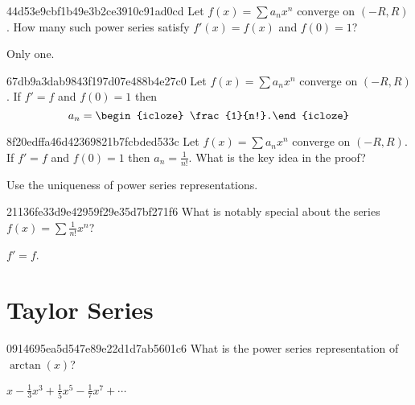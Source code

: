 \begin{note}{44d53e9cbf1b49e3b2ce3910c91ad0cd}
    Let \({ f(x) = \sum a_n x^{n} }\) converge on \({ (-R, R) }\).
    How many such power series satisfy \({ f'(x) = f(x) }\) and \({ f(0) = 1 }\)?

    \begin{cloze}{1}
        Only one.
    \end{cloze}
\end{note}

\begin{note}{67db9a3dab9843f197d07e488b4e27c0}
    Let \({ f(x) = \sum a_n x^{n} }\) converge on \({ (-R, R) }\). If \({ f' = f }\) and \({ f(0) = 1 }\) then
    \[
        a_n = \begin{icloze}{1}\frac{1}{n!}.\end{icloze}
    \]
\end{note}

\begin{note}{8f20edffa46d42369821b7fcbded533c}
    Let \({ f(x) = \sum a_n x^{n} }\) converge on \({ (-R, R) }\). If \({ f' = f }\) and \({ f(0) = 1 }\) then \({ a_n = \frac{1}{n!} }\).
    What is the key idea in the proof?

    \begin{cloze}{1}
        Use the uniqueness of power series representations.
    \end{cloze}
\end{note}

\begin{note}{21136fe33d9e42959f29e35d7bf271f6}
    What is notably special about the series \({ f(x) = \sum \frac{1}{n!} x^{n} }\)?

    \begin{cloze}{1}
        \({ f' = f }\).
    \end{cloze}
\end{note}

\section{Taylor Series}
\begin{note}{0914695ea5d547e89e22d1d7ab5601c6}
    What is the power series representation of \({ \arctan(x) }\)?

    \begin{cloze}{1}
        \({ x - \frac{1}{3}x^{3} + \frac{1}{5}x^{5} - \frac{1}{7} x^{7} + \cdots }\)
    \end{cloze}
\end{note}

